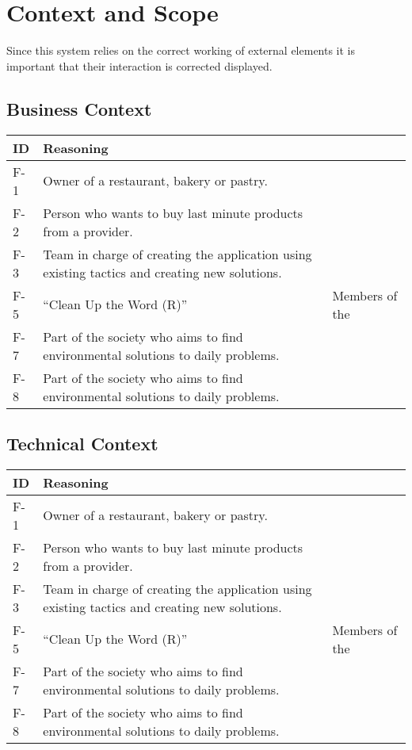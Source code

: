 \section{Context and Scope}

Since this system relies on the correct working of external elements it is important that their interaction is 
corrected displayed.

\subsection{Business Context}

\begin{table}[H]
    \begin{tabularx}{\textwidth}{lX}
    \toprule
    ID & Reasoning   \\
    \midrule
    F-1 & Owner of a restaurant, bakery or pastry. \\
    F-2 & Person who wants to buy last minute products from a provider. \\
    F-3 & Team in charge of creating the application using existing tactics and creating new solutions. \\
    F-5 & ``Clean Up the Word (R)'' & Members of the  \\
    F-7 & Part of the society who aims to find environmental solutions to daily problems. \\
    F-8 & Part of the society who aims to find environmental solutions to daily problems. \\
    \bottomrule
    \end{tabularx}
\end{table}

\subsection{Technical Context}

\begin{table}[H]
    \begin{tabularx}{\textwidth}{lX}
    \toprule
    ID & Reasoning   \\
    \midrule
    F-1 & Owner of a restaurant, bakery or pastry. \\
    F-2 & Person who wants to buy last minute products from a provider. \\
    F-3 & Team in charge of creating the application using existing tactics and creating new solutions. \\
    F-5 & ``Clean Up the Word (R)'' & Members of the  \\
    F-7 & Part of the society who aims to find environmental solutions to daily problems. \\
    F-8 & Part of the society who aims to find environmental solutions to daily problems. \\
    \bottomrule
    \end{tabularx}
\end{table}